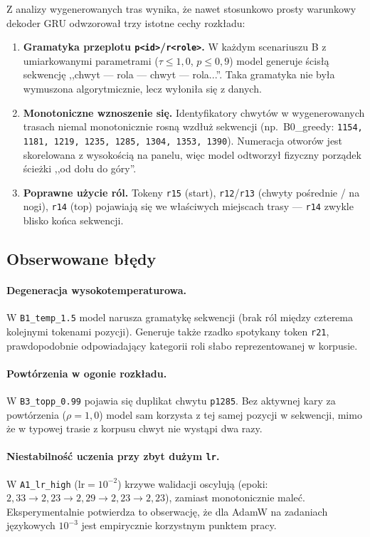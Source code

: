 \documentclass[12pt,a4paper]{article}
\begin{document}
Z analizy wygenerowanych tras wynika, że nawet stosunkowo prosty warunkowy dekoder GRU odwzorował trzy istotne cechy rozkładu:
\begin{enumerate}[leftmargin=1.5em]
    \item \textbf{Gramatyka przeplotu \texttt{p<id>}/\texttt{r<role>}.} W każdym scenariuszu B z umiarkowanymi parametrami ($\tau\le 1{,}0$, $p\le 0{,}9$) model generuje ścisłą sekwencję ,,chwyt --- rola --- chwyt --- rola...''. Taka gramatyka nie była wymuszona algorytmicznie, lecz wyłoniła się z danych.
    \item \textbf{Monotoniczne wznoszenie się.} Identyfikatory chwytów w wygenerowanych trasach niemal monotonicznie rosną wzdłuż sekwencji (np.\ B0\_greedy: \texttt{1154, 1181, 1219, 1235, 1285, 1304, 1353, 1390}). Numeracja otworów jest skorelowana z wysokością na panelu, więc model odtworzył fizyczny porządek ścieżki ,,od dołu do góry''.
    \item \textbf{Poprawne użycie ról.} Tokeny \texttt{r15} (start), \texttt{r12}/\texttt{r13} (chwyty pośrednie / na nogi), \texttt{r14} (top) pojawiają się we właściwych miejscach trasy --- \texttt{r14} zwykle blisko końca sekwencji.
\end{enumerate}

\subsection{Obserwowane błędy}

\paragraph{Degeneracja wysokotemperaturowa.}
W \texttt{B1\_temp\_1.5} model narusza gramatykę sekwencji (brak ról między czterema kolejnymi tokenami pozycji). Generuje także rzadko spotykany token \texttt{r21}, prawdopodobnie odpowiadający kategorii roli słabo reprezentowanej w korpusie.

\paragraph{Powtórzenia w ogonie rozkładu.}
W \texttt{B3\_topp\_0.99} pojawia się duplikat chwytu \texttt{p1285}. Bez aktywnej kary za powtórzenia ($\rho=1{,}0$) model sam korzysta z tej samej pozycji w sekwencji, mimo że w typowej trasie z korpusu chwyt nie wystąpi dwa razy.

\paragraph{Niestabilność uczenia przy zbyt dużym \texttt{lr}.}
W \texttt{A1\_lr\_high} (lr$=10^{-2}$) krzywe walidacji oscylują (epoki: $2{,}33 \to 2{,}23 \to 2{,}29 \to 2{,}23 \to 2{,}23$), zamiast monotonicznie maleć. Eksperymentalnie potwierdza to obserwację, że dla AdamW na zadaniach językowych $10^{-3}$ jest empirycznie korzystnym punktem pracy.
\end{document}
